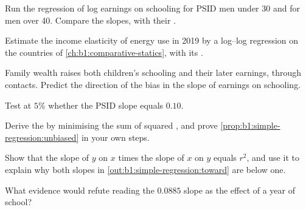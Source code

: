 \begin{exercise}[$\star\star$]\label{exo:b1:simple-regression:ages}
Run the regression of log earnings on schooling for PSID men under 30 and for
men over 40. Compare the slopes, with their .
\end{exercise}

\begin{exercise}[$\star\star$]\label{exo:b1:simple-regression:energy}
Estimate the income elasticity of energy use in 2019 by a log--log regression
on the countries of \cref{ch:b1:comparative-statics}, with its .
\end{exercise}

\begin{exercise}[$\star\star$]\label{exo:b1:simple-regression:direction}
Family wealth raises both children's schooling and their later earnings,
through contacts. Predict the direction of the bias in the slope of earnings
on schooling.
\end{exercise}

\begin{exercise}[$\star\star$]\label{exo:b1:simple-regression:test}
Test at $5\%$ whether the PSID slope equals $0.10$.
\end{exercise}

\begin{exercise}[$\star\star\star$]\label{exo:b1:simple-regression:derive}
Derive the   by minimising the sum of squared , and
prove \cref{prop:b1:simple-regression:unbiased} in your own steps.
\end{exercise}

\begin{exercise}[$\star\star\star$]\label{exo:b1:simple-regression:product}
Show that the slope of $y$ on $x$ times the slope of $x$ on $y$ equals $r^2$, and use it to
explain why both slopes in \cref{out:b1:simple-regression:toward} are below one.
\end{exercise}

\begin{exercise}[$\star\star\star$]\label{exo:b1:simple-regression:refute}
What evidence would refute reading the $0.0885$ slope as the effect of a year
of school?
\end{exercise}

